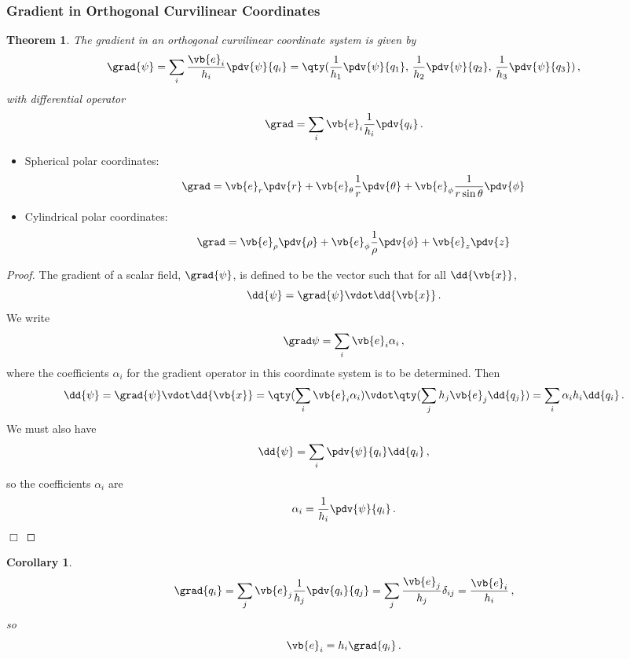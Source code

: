 \documentclass{article}
\theoremstyle{plain}\theoremheaderfont{\normalfont\itshape}\theorembodyfont{\rmfamily}\theoremseparator{.}\newtheorem*{rem}{Remark}\newtheorem*{ex}{Example}\newtheorem*{proof}{Proof}\newtheorem*{altp}{Alternative proof}
\theoremstyle{plain}\theoremheaderfont{\normalfont\bfseries}\theorembodyfont{\rmfamily}\theoremseparator{.}\newtheorem{thm}{Theorem}[section]\newtheorem{lem}[thm]{Lemma}\newtheorem{prop}[thm]{Proposition}\newtheorem*{cor}{Corollary}\newtheorem{defn}[thm]{Definition}\newtheorem{clm}[thm]{Claim}\newtheorem{clminproof}{Claim}
\theoremstyle{break}\theoremheaderfont{\normalfont\itshape}\theorembodyfont{\rmfamily}\theoremseparator{.\medskip}\newtheorem*{proofskip}{Proof}\newtheorem*{exs}{Examples}\newtheorem*{rems}{Remarks}
\theoremstyle{break}\theoremheaderfont{\normalfont\bfseries}\theorembodyfont{\rmfamily}\theoremseparator{.\medskip}\newtheorem{lemskip}[thm]{Lemma}\newtheorem{defnskip}[thm]{Definition}\newtheorem{propskip}[thm]{Proposition}\newtheorem{thmskip}[thm]{Theorem}
\numberwithin{equation}{section}
\newcommand{\qed}{\hfill\ensuremath{\Box}}
\begin{document}
	\subsubsection{Gradient in Orthogonal Curvilinear Coordinates}
	\begin{thm}
		The gradient in an orthogonal curvilinear coordinate system is given by
		\[\grad{\psi}=\sum_{i}\frac{\vb{e}_i}{h_i}\pdv{\psi}{q_i}=\qty(\frac{1}{h_1}\pdv{\psi}{q_1},\, \frac{1}{h_2}\pdv{\psi}{q_2},\, \frac{1}{h_3}\pdv{\psi}{q_3})\,,\]
		with differential operator
		\[\grad=\sum_{i}\vb{e}_i\frac{1}{h_i}\pdv{q_i}\,.\]
	\end{thm}
	\begin{itemize}
		\item Spherical polar coordinates:
		\[\grad=\vb{e}_r\pdv{r}+\vb{e}_\theta\frac{1}{r}\pdv{\theta}+\vb{e}_\phi\frac{1}{r\sin\theta}\pdv{\phi}\]
		\item Cylindrical polar coordinates:
		\[\grad=\vb{e}_\rho\pdv{\rho}+\vb{e}_\phi\frac{1}{\rho}\pdv{\phi}+\vb{e}_z\pdv{z}\]
	\end{itemize}
	\begin{proof}
		The gradient of a scalar field, \(\grad{\psi}\), is defined to be the vector such that for all \(\dd{\vb{x}}\),
		\[\dd{\psi}=\grad{\psi}\vdot\dd{\vb{x}}\,.\]
		We write
		\[\grad\psi=\sum_i \vb{e}_i\alpha_i\,,\]
		where the coefficients \(\alpha_i\) for the gradient operator in this coordinate system is to be determined. Then
		\[\dd{\psi}=\grad{\psi}\vdot\dd{\vb{x}}=\qty(\sum_{i}\vb{e}_i\alpha_i)\vdot\qty(\sum_{j}h_j\vb{e}_j\dd{q_j})=\sum_i\alpha_i h_i\dd{q_i}\,.\]
		We must also have
		\[\dd{\psi}=\sum_{i}\pdv{\psi}{q_i}\dd{q_i}\,,\]
		so the coefficients \(\alpha_i\) are
		\[\alpha_i=\frac{1}{h_i}\pdv{\psi}{q_i}\,.\]\qed
	\end{proof}
	\begin{cor}
		\[\grad{q_i}=\sum_{j}\vb{e}_j\frac{1}{h_j}\pdv{q_i}{q_j}=\sum_{j}\frac{\vb{e}_j}{h_j}\delta_{ij}=\frac{\vb{e}_i}{h_i}\,,\]
		so
		\[\vb{e}_i=h_i\grad{q_i}\,.\]
	\end{cor}
\end{document}
